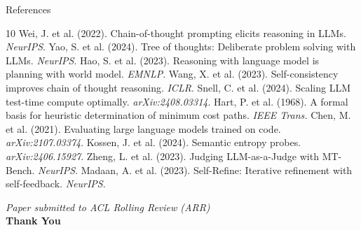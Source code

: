 \documentclass[t]{beamer}
\begin{document}
\begin{frame}{References}
\tiny
\begin{thebibliography}{10}
 Wei, J. et al. (2022). Chain-of-thought prompting elicits reasoning in LLMs. \textit{NeurIPS}.
 Yao, S. et al. (2024). Tree of thoughts: Deliberate problem solving with LLMs. \textit{NeurIPS}.
 Hao, S. et al. (2023). Reasoning with language model is planning with world model. \textit{EMNLP}.
 Wang, X. et al. (2023). Self-consistency improves chain of thought reasoning. \textit{ICLR}.
 Snell, C. et al. (2024). Scaling LLM test-time compute optimally. \textit{arXiv:2408.03314}.
 Hart, P. et al. (1968). A formal basis for heuristic determination of minimum cost paths. \textit{IEEE Trans.}
 Chen, M. et al. (2021). Evaluating large language models trained on code. \textit{arXiv:2107.03374}.
 Kossen, J. et al. (2024). Semantic entropy probes. \textit{arXiv:2406.15927}.
 Zheng, L. et al. (2023). Judging LLM-as-a-Judge with MT-Bench. \textit{NeurIPS}.
 Madaan, A. et al. (2023). Self-Refine: Iterative refinement with self-feedback. \textit{NeurIPS}.
\end{thebibliography}

\vspace{0.3em}
\centering
{\scriptsize\textit{Paper submitted to ACL Rolling Review (ARR)}}\\[0.5em]
{\Large\bfseries Thank You}
\end{frame}
\end{document}
